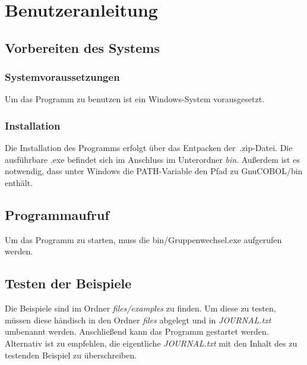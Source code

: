 \chapter{Benutzeranleitung}\label{ch:benutzeranleitung}


\section{Vorbereiten des Systems}\label{sec:vorbereiten-des-systems}

\subsection{Systemvoraussetzungen}\label{subsec:systemvoraussetzungen}
Um das Programm zu benutzen ist ein Windows-System vorausgesetzt.

\subsection{Installation}\label{subsec:installation}
Die Installation des Programms erfolgt über das Entpacken der~.zip-Datei.
Die ausführbare .exe befindet sich im Anschluss im Unterordner \textit{bin}.
Außerdem ist es notwendig, dass unter Windows die PATH-Variable den Pfad zu GnuCOBOL/bin enthält.

\section{Programmaufruf}\label{sec:programmaufruf}
Um das Programm zu starten, muss die bin/Gruppenwechsel.exe aufgerufen werden.

\section{Testen der Beispiele}\label{sec:testen-der-beispiele}
Die Beispiele sind im Ordner \textit{files/examples} zu finden. Um diese zu testen, müssen diese händisch in den Ordner \textit{files} abgelegt und in \textit{JOURNAL.txt} umbenannt werden. Anschließend kann das Programm gestartet werden.
Alternativ ist zu empfehlen, die eigentliche \textit{JOURNAL.txt} mit den Inhalt des zu testenden Beispiel zu überschreiben.
